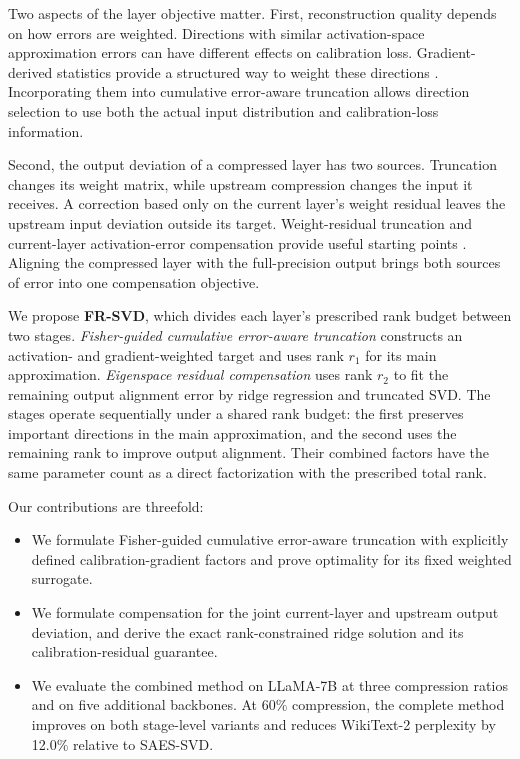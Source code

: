 \documentclass[11pt]{article}
\begin{document}
Two aspects of the layer objective matter. First, reconstruction quality depends on how errors are weighted. Directions with similar activation-space approximation errors can have different effects on calibration loss. Gradient-derived statistics provide a structured way to weight these directions \citep{hsu2022fwsvd,chekalina2025gfwsvd}. Incorporating them into cumulative error-aware truncation allows direction selection to use both the actual input distribution and calibration-loss information.

Second, the output deviation of a compressed layer has two sources. Truncation changes its weight matrix, while upstream compression changes the input it receives. A correction based only on the current layer's weight residual leaves the upstream input deviation outside its target. Weight-residual truncation and current-layer activation-error compensation provide useful starting points \citep{bai2025ercsvd,liu2025eora}. Aligning the compressed layer with the full-precision output brings both sources of error into one compensation objective.

We propose \textbf{FR-SVD}, which divides each layer's prescribed rank budget between two stages. \emph{Fisher-guided cumulative error-aware truncation} constructs an activation- and gradient-weighted target and uses rank $r_1$ for its main approximation. \emph{Eigenspace residual compensation} uses rank $r_2$ to fit the remaining output alignment error by ridge regression and truncated SVD. The stages operate sequentially under a shared rank budget: the first preserves important directions in the main approximation, and the second uses the remaining rank to improve output alignment. Their combined factors have the same parameter count as a direct factorization with the prescribed total rank.

Our contributions are threefold:
\begin{itemize}
\item We formulate Fisher-guided cumulative error-aware truncation with explicitly defined calibration-gradient factors and prove optimality for its fixed weighted surrogate.
\item We formulate compensation for the joint current-layer and upstream output deviation, and derive the exact rank-constrained ridge solution and its calibration-residual guarantee.
\item We evaluate the combined method on LLaMA-7B at three compression ratios and on five additional backbones. At 60\% compression, the complete method improves on both stage-level variants and reduces WikiText-2 perplexity by 12.0\% relative to SAES-SVD.
\end{itemize}
\end{document}
